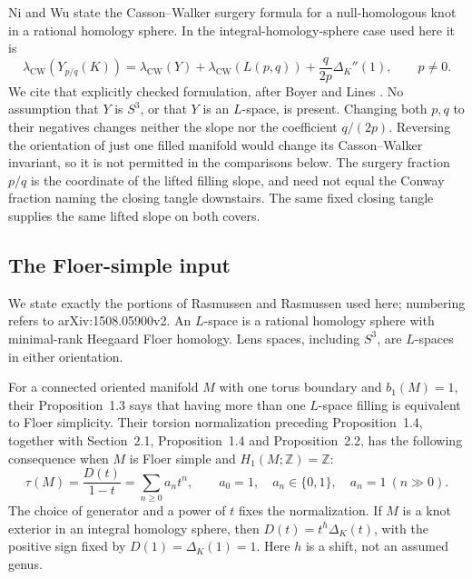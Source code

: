 \documentclass[11pt]{amsart}
\theoremstyle{definition}
\theoremstyle{remark}
\newcommand{\Z}{\mathbb Z}
\newcommand{\lCW}{\lambda_{\mathrm{CW}}}
\begin{document}
Ni and Wu \cite[Proposition~3.1, equation~(7)]{NiWu}
state the Casson--Walker surgery formula for a
null-homologous knot in a rational homology sphere.
In the integral-homology-sphere case used here it is
\begin{equation}\label{eq:cw}
 \lCW(Y_{p/q}(K))
 =\lCW(Y)+\lCW(L(p,q))
       +\frac{q}{2p}\Delta_K''(1),\qquad p\ne0.
\end{equation}
We cite that explicitly checked formulation, after
Boyer and Lines \cite{BoyerLines}. No assumption that \(Y\)
is \(S^3\), or that \(Y\) is an \(L\)-space, is present.
Changing both \(p,q\) to their negatives changes neither
the slope nor the coefficient \(q/(2p)\).
Reversing the orientation of just one filled manifold
would change its Casson--Walker invariant, so it is not
permitted in the comparisons below. The surgery fraction \(p/q\)
is the coordinate of the lifted filling slope, and need not equal
the Conway fraction naming the closing tangle downstairs. The same
fixed closing tangle supplies the same lifted slope on both covers.

\subsection{The Floer-simple input}\label{subsec:floer}

We state exactly the portions of Rasmussen and Rasmussen
\cite{RR} used here; numbering refers to arXiv:1508.05900v2.
An \(L\)-space is a rational homology sphere with minimal-rank
Heegaard Floer homology. Lens spaces, including \(S^3\), are
\(L\)-spaces in either orientation.

For a connected oriented manifold \(M\) with one torus
boundary and \(b_1(M)=1\), their Proposition~1.3 says that
having more than one \(L\)-space filling is equivalent to
Floer simplicity. Their torsion normalization preceding
Proposition~1.4, together with Section~2.1, Proposition~1.4
and Proposition~2.2, has the following consequence when \(M\) is Floer simple and
\(H_1(M;\Z)=\Z\):
\begin{equation}\label{eq:binarytorsion}
 \tau(M)=\frac{D(t)}{1-t}
         =\sum_{n\ge0}a_nt^n,\qquad
 a_0=1,\quad a_n\in\{0,1\},\quad a_n=1\ (n\gg0).
\end{equation}
The choice of generator and a power of \(t\) fixes the
normalization. If \(M\) is a knot exterior in an integral
homology sphere, then \(D(t)=t^h\Delta_K(t)\), with the
positive sign fixed by \(D(1)=\Delta_K(1)=1\).
Here \(h\) is a shift, not an assumed genus.
\end{document}
